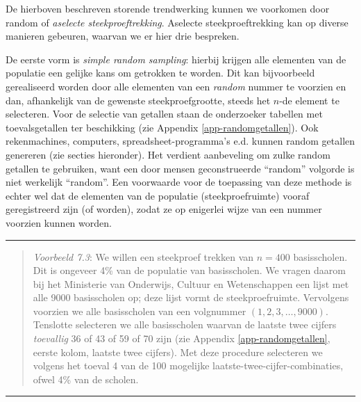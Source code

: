 \documentclass[
]{book}
\begin{document}
De hierboven beschreven storende trendwerking kunnen we voorkomen door
random of \emph{aselecte steekproeftrekking}. Aselecte steekproeftrekking kan
op diverse manieren gebeuren, waarvan we er hier drie bespreken.

De eerste vorm is \emph{simple random sampling}: hierbij krijgen alle
elementen van de populatie een gelijke kans om getrokken te worden. Dit
kan bijvoorbeeld gerealiseerd worden door alle elementen van een
\emph{random} nummer te voorzien en dan, afhankelijk van de gewenste
steekproefgrootte, steeds het \(n\)-de element te selecteren. Voor de
selectie van getallen staan de onderzoeker tabellen met toevalsgetallen
ter beschikking (zie Appendix \ref{app-randomgetallen}).
Ook rekenmachines, computers,
spreadsheet-programma's e.d. kunnen random getallen genereren (zie secties hieronder).
Het verdient aanbeveling om zulke random getallen te gebruiken, want een
door mensen geconstrueerde ``random'' volgorde is niet werkelijk
``random''. Een voorwaarde voor de toepassing van deze methode is echter
wel dat de elementen van de populatie (steekproefruimte) vooraf
geregistreerd zijn (of worden), zodat ze op enigerlei wijze van een
nummer voorzien kunnen worden.

\begin{center}\rule{0.5\linewidth}{0.5pt}\end{center}

\begin{quote}
\emph{Voorbeeld 7.3}: We willen een steekproef trekken
van \(n=400\) basisscholen. Dit is ongeveer 4\% van de populatie van
basisscholen. We vragen daarom bij het Ministerie van Onderwijs, Cultuur
en Wetenschappen een lijst met alle 9000 basisscholen op; deze lijst
vormt de steekproefruimte. Vervolgens voorzien we alle basisscholen van
een volgnummer \((1, 2, 3, \ldots, 9000)\). Tenslotte selecteren we alle
basisscholen waarvan de laatste twee cijfers \emph{toevallig} 36 of 43 of 59
of 70 zijn (zie Appendix \ref{app-randomgetallen}, eerste kolom, laatste twee cijfers).
Met deze procedure selecteren we volgens het toeval 4 van de 100
mogelijke laatste-twee-cijfer-combinaties, ofwel 4\% van de scholen.
\end{quote}

\begin{center}\rule{0.5\linewidth}{0.5pt}\end{center}
\end{document}
